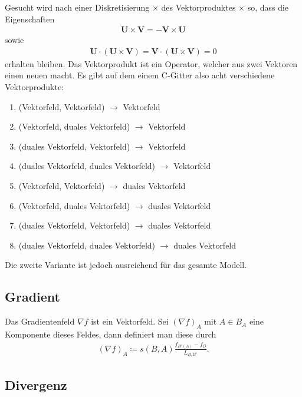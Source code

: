 \documentclass{book}
\begin{document}
Gesucht wird nach einer Diskretisierung $\times$ des Vektorproduktes $\times$ so, dass die Eigenschaften
%
\begin{eqnarray}
\mathbf{U}\times\mathbf{V} = -\mathbf{V}\times\mathbf{U}
\end{eqnarray}
%
sowie
%
\begin{eqnarray}
\mathbf{U}\cdot\left(\mathbf{U}\times\mathbf{V}\right) = \mathbf{V}\cdot\left(\mathbf{U}\times\mathbf{V}\right) = 0
\end{eqnarray}
%
erhalten bleiben. Das Vektorprodukt ist ein Operator, welcher aus zwei Vektoren einen neuen macht. Es gibt auf dem einem C-Gitter also acht verschiedene Vektorprodukte:
%
\begin{enumerate}
\item (Vektorfeld, Vektorfeld) $\rightarrow$ Vektorfeld
\item (Vektorfeld, duales Vektorfeld) $\rightarrow$ Vektorfeld
\item (duales Vektorfeld, Vektorfeld) $\rightarrow$ Vektorfeld
\item (duales Vektorfeld, duales Vektorfeld) $\rightarrow$ Vektorfeld
\item (Vektorfeld, Vektorfeld) $\rightarrow$ duales Vektorfeld
\item (Vektorfeld, duales Vektorfeld) $\rightarrow$ duales Vektorfeld
\item (duales Vektorfeld, Vektorfeld) $\rightarrow$ duales Vektorfeld
\item (duales Vektorfeld, duales Vektorfeld) $\rightarrow$ duales Vektorfeld
\end{enumerate}
%
Die zweite Variante ist jedoch ausreichend für das gesamte Modell.

\subsection{Gradient}
\label{sec:gradient}

Das Gradientenfeld $\nabla f$ ist ein Vektorfeld. Sei $\left(\nabla f\right)_{A}$ mit $A\in B_A$ eine Komponente dieses Feldes, dann definiert man diese durch
%
\begin{eqnarray}
\left(\nabla f\right)_{A} \coloneqq s\left(B, A\right)\frac{f_{B'\left(A\right)} - f_{B}}{L_{B, B'}}.
\end{eqnarray}
%
\subsection{Divergenz}
\label{sec:divergenz_dynamischer_kern}
\end{document}
